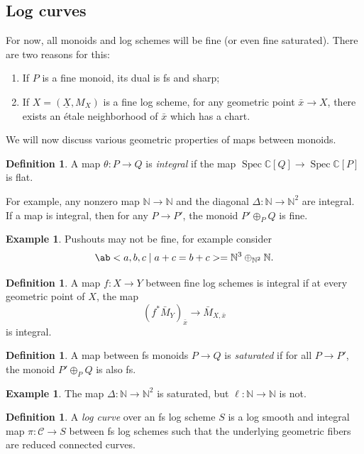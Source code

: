 \documentclass{amsart}
\theoremstyle{definition}
\newtheorem{defn}[thm]{Definition}
\newtheorem{exm}[thm]{Example}
\theoremstyle{remark}
\theoremstyle{plain}
\theoremstyle{definition}
\theoremstyle{remark}
\newcommand{\N}{\mathbb{N}}
\newcommand{\C}{\mathbb{C}}
\newcommand{\mc}[1]{\mathcal{#1}}
\newcommand{\ul}[1]{\underline{#1}}
\newcommand{\1}{\mathbf{1}}
\newcommand{\2}{\mathbf{2}}
\newcommand{\3}{\mathbf{3}}
\DeclareMathOperator{\Spec}{Spec}
\begin{document}
\subsection{Log curves}%
\label{sub:Log curves}

For now, all monoids and log schemes will be fine (or even fine saturated). There are two reasons for this:
\begin{enumerate}
    \item If \(P\) is a fine monoid, its dual is fs and sharp;
    \item If \(X = (\ul{X}, M_X)\) is a fine log scheme, for any geometric point \(\bar{x} \to X\), there exists an \'etale neighborhood of \(\bar{x}\) which has a chart.
\end{enumerate}

We will now discuss various geometric properties of maps between monoids.
\begin{defn}
    A map \(\theta \colon P \to Q\) is \textit{integral} if the map \(\Spec\C[Q] \to \Spec \C[P]\) is flat.
\end{defn}

For example, any nonzero map \(\N \to \N\) and the diagonal \(\Delta \colon\N \to \N^2\) are integral. If a map is integral, then for any \(P \to P'\), the monoid \(P' \oplus_P Q\) is fine.

\begin{exm}
    Pushouts may not be fine, for example consider
    \[ \ab< a ,b,c \mid a+c=b+c> = \N^3 \oplus_{\N^2} \N. \]
\end{exm}

\begin{defn}
    A map \(f \colon X \to Y\) between fine log schemes is integral if at every geometric point of \(X\), the map
    \[ (f^*\bar{M}_Y)_{\bar{x}} \to \bar{M}_{X,\bar{x}} \]
    is integral.
\end{defn}

\begin{defn}
    A map between fs monoids \(P \to Q\) is \textit{saturated} if for all \(P \to P'\), the monoid \(P' \oplus_P Q\) is also fs.
\end{defn}

\begin{exm}
    The map \(\Delta \colon \N \to \N^2\) is saturated, but \(\ell \colon \N \to \N\) is not.
\end{exm}

\begin{defn}
    A \textit{log curve} over an fs log scheme \(S\) is a log smooth and integral map \(\pi \colon \mc{C} \to S\) between fs log schemes such that the underlying geometric fibers are reduced connected curves.
\end{defn}
\end{document}
